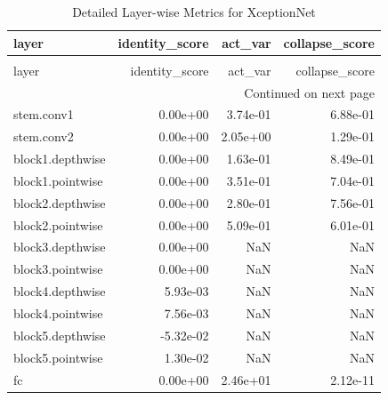 \begin{longtable}{lrrr}
\caption{Detailed Layer-wise Metrics for XceptionNet} \label{tab:layer_metrics_xceptionnet} \\
\toprule
layer & identity_score & act_var & collapse_score \\
\midrule
\endfirsthead
\caption[]{Detailed Layer-wise Metrics for XceptionNet} \\
\toprule
layer & identity_score & act_var & collapse_score \\
\midrule
\endhead
\midrule
\multicolumn{4}{r}{Continued on next page} \\
\midrule
\endfoot
\bottomrule
\endlastfoot
stem.conv1 & 0.00e+00 & 3.74e-01 & 6.88e-01 \\
stem.conv2 & 0.00e+00 & 2.05e+00 & 1.29e-01 \\
block1.depthwise & 0.00e+00 & 1.63e-01 & 8.49e-01 \\
block1.pointwise & 0.00e+00 & 3.51e-01 & 7.04e-01 \\
block2.depthwise & 0.00e+00 & 2.80e-01 & 7.56e-01 \\
block2.pointwise & 0.00e+00 & 5.09e-01 & 6.01e-01 \\
block3.depthwise & 0.00e+00 & NaN & NaN \\
block3.pointwise & 0.00e+00 & NaN & NaN \\
block4.depthwise & 5.93e-03 & NaN & NaN \\
block4.pointwise & 7.56e-03 & NaN & NaN \\
block5.depthwise & -5.32e-02 & NaN & NaN \\
block5.pointwise & 1.30e-02 & NaN & NaN \\
fc & 0.00e+00 & 2.46e+01 & 2.12e-11 \\
\end{longtable}
